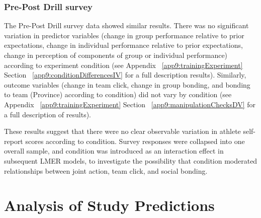 





\subsubsection{Pre-Post Drill survey}
The Pre-Post Drill survey data showed similar results.
There was no significant variation in predictor variables (change in group performance relative to prior expectations, change in individual performance relative to prior expectations, change in perception of components of group or individual performance) according to experiment condition (see Appendix ~\ref{app9:trainingExperiment} Section ~\ref{app9:conditionDifferencesIV} for a full description results).  Similarly, outcome variables (change in team click, change in group bonding, and bonding to team (Province) according to condition) did not vary by condition (see Appendix ~\ref{app9:trainingExperiment} Section ~\ref{app9:manipulationChecksDV} for a full description of results).


These results suggest that there were no clear observable variation in athlete self-report scores according to condition.  Survey responses were collapsed into one overall sample, and condition was introduced as an interaction effect in subsequent LMER models, to investigate the possibility that condition moderated relationships between joint action, team click, and social bonding.














\section{Analysis of Study Predictions\label{sect:resultsStudyPredictions}}






